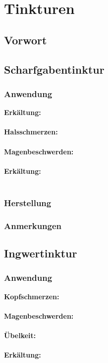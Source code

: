 \chapter{Tinkturen}

\section{Vorwort}

\lipsum[1-5]
\newpage


\section{Scharfgabentinktur}

\subsection{Anwendung}

\textbf{Erkältung:} \\ \\
\textbf{Halsschmerzen:} \\ \\
\textbf{Magenbeschwerden:} \\ \\
\textbf{Erkältung:} \\ \\


\subsection{Herstellung}

\subsection{Anmerkungen}



\section{Ingwertinktur}

\subsection{Anwendung}

\textbf{Kopfschmerzen:} \\ \\
\textbf{Magenbeschwerden:} \\ \\
\textbf{Übelkeit:} \\ \\
\textbf{Erkältung:} \\ \\

